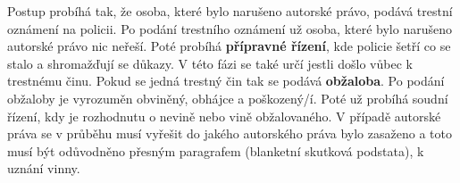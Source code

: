 Postup probíhá tak, že osoba, které bylo narušeno autorské právo, podává trestní oznámení na policii. Po podání trestního oznámení už osoba, které bylo narušeno autorské právo nic neřeší. Poté probíhá \textbf{přípravné řízení}, kde policie šetří co se stalo a shromažďují se důkazy. V této fázi se také určí jestli došlo vůbec k trestnému činu. Pokud se jedná trestný čin tak se podává \textbf{obžaloba}. Po podání obžaloby je vyrozuměn obviněný, obhájce a poškozený/í. Poté už probíhá soudní řízení, kdy je rozhodnutu o nevině nebo vině obžalovaného. V případě autorské práva se v průběhu musí vyřešit do jakého autorského práva bylo zasaženo a toto musí být odůvodněno přesným paragrafem (blanketní skutková podstata), k uznání vinny.